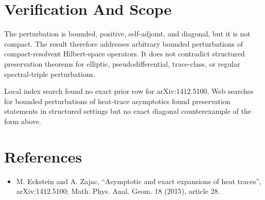 \documentclass[11pt]{article}
\begin{document}
\section*{Verification And Scope}

The perturbation is bounded, positive, self-adjoint, and diagonal, but it is
not compact.  The result therefore addresses arbitrary bounded perturbations
of compact-resolvent Hilbert-space operators.  It does not contradict
structured preservation theorems for elliptic, pseudodifferential,
trace-class, or regular spectral-triple perturbations.

Local index search found no exact prior row for arXiv:1412.5100.  Web searches
for bounded perturbations of heat-trace asymptotics found preservation
statements in structured settings but no exact diagonal counterexample of the
form above.

\section*{References}

\begin{itemize}
\item M. Eckstein and A. Zajac, ``Asymptotic and exact expansions of heat
traces'', arXiv:1412.5100; Math. Phys. Anal. Geom. 18 (2015), article 28.
\end{itemize}
\end{document}
